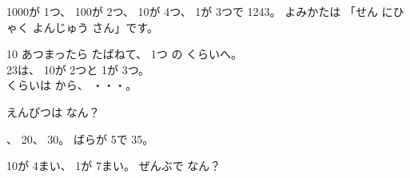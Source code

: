 \noindent 1000が 1つ、 100が 2つ、 10が 4つ、 1が 3つで 1243。 よみかたは 「せん にひゃく よんじゅう さん」です。

\begin{taisetsu}
10 あつまったら たばねて、 1つ の くらいへ。\\
23は、 10が 2つと 1が 3つ。\\
くらいは から、 ・・・。
\end{taisetsu}

\begin{reidai}
えんぴつは なん？\par\vspace{3pt}
\noindent\begin{minipage}[c]{0.4\linewidth}
、 20、 30。 ばらが 5で 35。

\end{minipage}\hfill
\begin{minipage}[c]{0.58\linewidth}\centering
{}
\end{minipage}
\end{reidai}

\begin{jibun}
\noindent\begin{minipage}[c]{0.46\linewidth}
10が 4まい、 1が 7まい。 ぜんぶで なん？
\end{minipage}\hfill
\begin{minipage}[c]{0.52\linewidth}\centering
{}
\end{minipage}
\bkkotaeran[6\zw]
\end{jibun}

